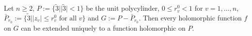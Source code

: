 Let $n \geqslant 2$, $P := \{ \tilde{3} | | \tilde{3}| < 1 \}$ be the unit polycylinder, $0 \leqslant r_v^0 < 1$ for $v = 1, \ldots, n$, $\bar{P}_{r_0} := \{ \tilde{3} | | z_v| \leqslant r_v^0 \text{ for all } v \}$ and $G := P - \bar{P}_{r_0}$. Then every holomorphic function $f$ on $G$ can be extended uniquely to a function holomorphic on $P$.
